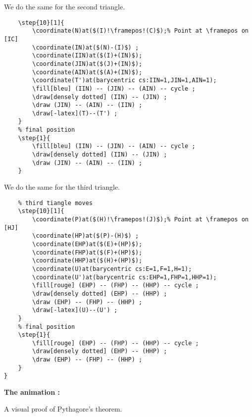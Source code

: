 \documentclass[a4paper,12pt]{article}
\begin{document}
We do the same for the second triangle.

\begin{lstlisting}[name=exemplecomplet]
	% second triangle moves
	\step{10}[1]{
		\coordinate(N)at($(I)!\framepos!(C)$);% Point at \framepos on [IC]
		\coordinate(IN)at($(N)-(I)$) ;
		\coordinate(IIN)at($(I)+(IN)$);
		\coordinate(JIN)at($(J)+(IN)$);
		\coordinate(AIN)at($(A)+(IN)$);
		\coordinate(T')at(barycentric cs:IIN=1,JIN=1,AIN=1);
		\fill[bleu] (IIN) -- (JIN) -- (AIN) -- cycle ;
		\draw[densely dotted] (IIN) -- (JIN) ;
		\draw (JIN) -- (AIN) -- (IIN) ;
		\draw[-latex](T)--(T') ;
	}
	% final position 
	\step{1}{
		\fill[bleu] (IIN) -- (JIN) -- (AIN) -- cycle ;
		\draw[densely dotted] (IIN) -- (JIN) ;
		\draw (JIN) -- (AIN) -- (IIN) ;
	}
 \end{lstlisting}
 
 We do the same for the third triangle.

 \begin{lstlisting}
	% third tiangle moves
	\step{10}[1]{
		\coordinate(P)at($(H)!\framepos!(J)$);% Point at \framepos on [HJ]
		\coordinate(HP)at($(P)-(H)$) ;
		\coordinate(EHP)at($(E)+(HP)$);
		\coordinate(FHP)at($(F)+(HP)$);
		\coordinate(HHP)at($(H)+(HP)$);
		\coordinate(U)at(barycentric cs:E=1,F=1,H=1);
		\coordinate(U')at(barycentric cs:EHP=1,FHP=1,HHP=1);
		\fill[rouge] (EHP) -- (FHP) -- (HHP) -- cycle ;
		\draw[densely dotted] (EHP) -- (HHP) ;
		\draw (EHP) -- (FHP) -- (HHP) ;
		\draw[-latex](U)--(U') ;
	}
	% final position
	\step{1}{
		\fill[rouge] (EHP) -- (FHP) -- (HHP) -- cycle ;
		\draw[densely dotted] (EHP) -- (HHP) ;
		\draw (EHP) -- (FHP) -- (HHP) ;
	}
}
\end{lstlisting}

\textbf{The animation :}

A visual proof of Pythagore's theorem.
\end{document}
